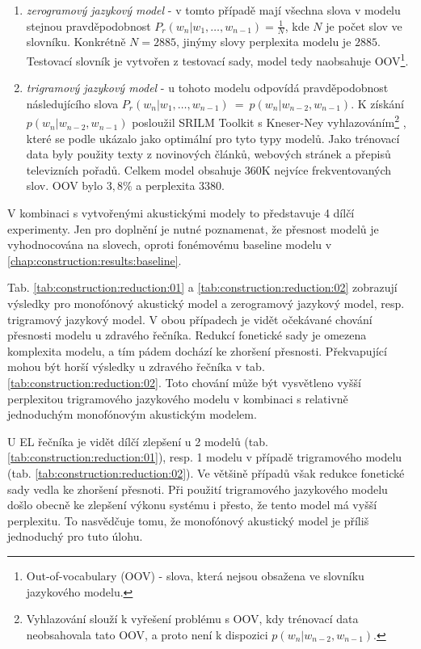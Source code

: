 \begin{enumerate}
  \item \textit{zerogramový jazykový model} - v tomto případě mají všechna slova v modelu stejnou pravděpodobnost $P_r(w_n|w_1,\dots,w_{n-1}) = \frac{1}{N}$, kde $N$ je počet slov ve slovníku. Konkrétně $N = 2885$, jinýmy slovy perplexita modelu je $2885$. Testovací slovník je vytvořen z testovací sady, model tedy naobsahuje OOV\footnote{Out-of-vocabulary (OOV) - slova, která nejsou obsažena ve slovníku jazykového modelu.}.
  \item \textit{trigramový jazykový model} - u tohoto modelu odpovídá pravděpodobnost následujícího slova $P_r(w_n|w_1,\dots,w_{n-1})~=~p(w_n|w_{n-2}, w_{n-1})$. K získání $p(w_n|w_{n-2}, w_{n-1})$ posloužil SRILM Toolkit s Kneser-Ney vyhlazováním\footnote{Vyhlazování slouží k vyřešení problému s OOV, kdy trénovací data neobsahovala tato OOV, a proto není k dispozici $p(w_n|w_{n-2}, w_{n-1})$.} \cite{Stolcke2002}, které se podle \cite{Prazak2008} ukázalo jako optimální pro tyto typy modelů. Jako trénovací data byly použity texty z novinových článků, webových stránek a přepisů televizních pořadů. Celkem model obsahuje 360K nejvíce frekventovaných slov. OOV bylo $3,8 \%$ a perplexita $3380$.
\end{enumerate}

\noindent V kombinaci s vytvořenými akustickými modely to představuje 4 dílčí experimenty. Jen pro doplnění je nutné poznamenat, že přesnost modelů je vyhodnocována na slovech, oproti fonémovému baseline modelu v \ref{chap:construction:results:baseline}.

Tab. \ref{tab:construction:reduction:01} a \ref{tab:construction:reduction:02} zobrazují výsledky pro monofónový akustický model a zerogramový jazykový model, resp. trigramový jazykový model. V obou případech je vidět očekávané chování přesnosti modelu u zdravého řečníka. Redukcí fonetické sady je omezena komplexita modelu, a tím pádem dochází ke zhoršení přesnosti. Překvapující mohou být horší výsledky u zdravého řečníka v tab. \ref{tab:construction:reduction:02}. Toto chování může být vysvětleno vyšší perplexitou trigramového jazykového modelu v kombinaci s relativně jednoduchým monofónovým akustickým modelem.

U EL řečníka je vidět dílčí zlepšení u 2 modelů (tab. \ref{tab:construction:reduction:01}), resp. 1 modelu v případě trigramového modelu (tab. \ref{tab:construction:reduction:02}). Ve většině případů však redukce fonetické sady vedla ke zhoršení přesnoti. Při použití trigramového jazykového modelu došlo obecně ke zlepšení výkonu systému i přesto, že tento model má vyšší perplexitu. To nasvědčuje tomu, že monofónový akustický model je příliš jednoduchý pro tuto úlohu.


